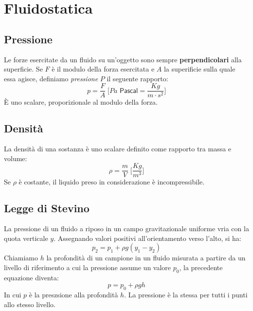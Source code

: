 \chapter{Fluidostatica}

    \section{Pressione} Le forze esercitate da un fluido su un'oggetto sono 
    sempre \textbf{perpendicolari} alla superficie. Se $F$ è il modulo della 
    forza esercitata e $A$ la superificie sulla quale essa agisce, definiamo
    \textit{pressione} $P$ il seguente rapporto:
        \begin{equation}
            p = \frac{F}{A} \; \Bigg[Pa \textsf{ Pascal} = \frac{Kg}{m \cdot 
            s^2} \Bigg]
        \end{equation}
    È uno scalare, proporizionale al modulo della forza.

    \section{Densità} La densità di una sostanza è uno scalare definito come 
    rapporto tra massa e volume:
        \begin{equation}
            \rho = \frac{m}{V} \; \Bigg[\frac{Kg}{m^3}\Bigg]
        \end{equation}
    Se $\rho$ è costante, il liquido preso in considerazione è incompressibile.

    \section{Legge di Stevino} La pressione di un fluido a riposo in un campo
    gravitazionale uniforme vria con la quota verticale $y$. Assegnando valori
    positivi all'orientamento verso l'alto, si ha:
        \begin{equation*}
            p_2 = p_1 + \rho g(y_1-y_2)
        \end{equation*}
    Chiamiamo $h$ la profondità di un campione in un fluido misurata a partire
    da un livello di riferimento a cui la pressione assume un valore $p_0$, la 
    precedente equazione diventa:
        \begin{equation}
            p = p_0 + \rho gh
        \end{equation}
    In cui $p$ è la preszsione alla profondità $h$.
    La pressione è la stessa per tutti i punti allo stesso livello.

